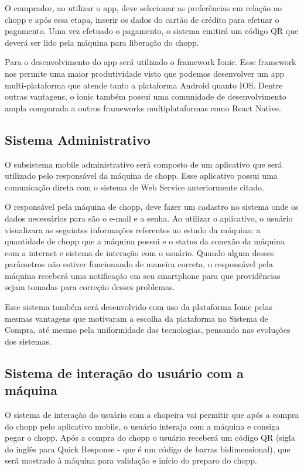 				O comprador, ao utilizar o app, deve selecionar as preferências em relação ao chopp e após essa etapa, inserir os dados do cartão de crédito para efetuar o pagamento. Uma vez efetuado o pagamento, o sistema emitirá um código QR que deverá ser lido pela máquina para liberação do chopp.

				Para o desenvolvimento do app será utilizado o framework Ionic. Esse framework nos permite uma maior produtividade visto que podemos desenvolver um app multi-plataforma que atende tanto a plataforma Android quanto IOS. Dentre outras vantagens, o ionic também possui uma comunidade de desenvolvimento ampla comparada a outros frameworks multiplataformas como React Native.

			\subsection[Sistema Administrativo]{Sistema Administrativo}
				O subsistema mobile administrativo será composto de um aplicativo que será utilizado pelo responsável da máquina de chopp. Esse aplicativo possui uma comunicação direta com o sistema de Web Service anteriormente citado.

				O responsável pela máquina de chopp, deve fazer um cadastro no sistema onde os dados necessários para são o e-mail e a senha. Ao utilizar o aplicativo, o usuário visualizara as seguintes informações referentes ao estado da máquina: a quantidade de chopp que a máquina possui e o status da conexão da máquina com a internet e sistema de interação com o usuário. Quando algum desses parâmetros não estiver funcionando de maneira correta, o responsável pela máquina receberá uma notificação em seu smartphone para que providências sejam tomadas para correção desses problemas. 

				Esse sistema também será desenvolvido com uso da plataforma Ionic pelas mesmas vantagens que motivaram a escolha da plataforma no Sistema de Compra, até mesmo pela uniformidade das tecnologias, pensando nas evoluções dos sistemas.

			\subsection[Sistema de interação do usuário com a máquina]{Sistema de interação do usuário com a máquina}
				O sistema de interação do usuário com a chopeira vai permitir que após a compra do chopp pelo aplicativo mobile, o usuário interaja com a máquina e consiga pegar o chopp. Após a compra do chopp o usuário receberá um código QR (sigla do inglês para Quick Response - que é um código de barras bidimensional), que será mostrado à máquina para validação e início do preparo do chopp.
				
